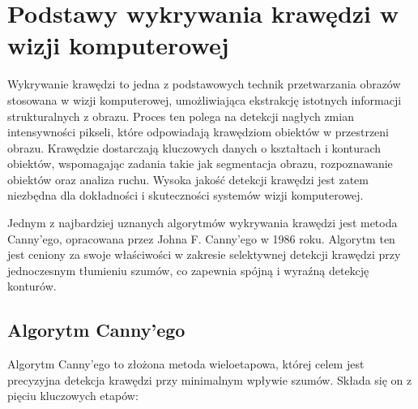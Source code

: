 \section{Podstawy wykrywania krawędzi w wizji komputerowej}

Wykrywanie krawędzi to jedna z podstawowych technik przetwarzania obrazów stosowana w wizji komputerowej, umożliwiająca ekstrakcję istotnych informacji strukturalnych z obrazu. Proces ten polega na detekcji nagłych zmian intensywności pikseli, które odpowiadają krawędziom obiektów w przestrzeni obrazu. Krawędzie dostarczają kluczowych danych o kształtach i konturach obiektów, wspomagając zadania takie jak segmentacja obrazu, rozpoznawanie obiektów oraz analiza ruchu. Wysoka jakość detekcji krawędzi jest zatem niezbędna dla dokładności i skuteczności systemów wizji komputerowej.

Jednym z najbardziej uznanych algorytmów wykrywania krawędzi jest metoda Canny'ego, opracowana przez Johna F. Canny’ego w 1986 roku. Algorytm ten jest ceniony za swoje właściwości w zakresie selektywnej detekcji krawędzi przy jednoczesnym tłumieniu szumów, co zapewnia spójną i wyraźną detekcję konturów.

\subsection{Algorytm Canny’ego}

Algorytm Canny’ego \cite{bib:canny-article} to złożona metoda wieloetapowa, której celem jest precyzyjna detekcja krawędzi przy minimalnym wpływie szumów. Składa się on z pięciu kluczowych etapów:

